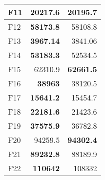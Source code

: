 \begin{table}[]
\begin{tabular}{l|r|r|}
\multicolumn{1}{|l|}{\cellcolor[HTML]{FCE6AB}F11}  & \cellcolor[HTML]{D3FFB6}\textbf{20217.6}                 & 20195.7                                                   \\ \hline
\multicolumn{1}{|l|}{\cellcolor[HTML]{FCE6AB}F12}  & \cellcolor[HTML]{D3FFB6}\textbf{58173.8}                 & 58108.8                                                   \\ \hline
\multicolumn{1}{|l|}{\cellcolor[HTML]{FCE6AB}F13}  & \cellcolor[HTML]{D3FFB6}\textbf{3967.14}                 & 3841.06                                                   \\ \hline
\multicolumn{1}{|l|}{\cellcolor[HTML]{FCE6AB}F14}  & \cellcolor[HTML]{D3FFB6}\textbf{53183.3}                 & 52534.5                                                   \\ \hline
\multicolumn{1}{|l|}{\cellcolor[HTML]{FCE6AB}F15}  & 62310.9                                                  & \cellcolor[HTML]{D3FFB6}\textbf{62661.5}                  \\ \hline
\multicolumn{1}{|l|}{\cellcolor[HTML]{FCE6AB}F16}  & \cellcolor[HTML]{D3FFB6}\textbf{38963}                   & 38120.5                                                   \\ \hline
\multicolumn{1}{|l|}{\cellcolor[HTML]{FCE6AB}F17}  & \cellcolor[HTML]{D3FFB6}\textbf{15641.2}                 & 15454.7                                                   \\ \hline
\multicolumn{1}{|l|}{\cellcolor[HTML]{FCE6AB}F18}  & \cellcolor[HTML]{D3FFB6}\textbf{22181.6}                 & 21423.6                                                   \\ \hline
\multicolumn{1}{|l|}{\cellcolor[HTML]{FCE6AB}F19}  & \cellcolor[HTML]{D3FFB6}\textbf{37575.9}                 & 36782.8                                                   \\ \hline
\multicolumn{1}{|l|}{\cellcolor[HTML]{FCE6AB}F20}  & 94259.5                                                  & \cellcolor[HTML]{D3FFB6}\textbf{94302.4}                  \\ \hline
\multicolumn{1}{|l|}{\cellcolor[HTML]{FCE6AB}F21}  & \cellcolor[HTML]{D3FFB6}\textbf{89232.8}                 & 88189.9                                                   \\ \hline
\multicolumn{1}{|l|}{\cellcolor[HTML]{FCE6AB}F22}  & \cellcolor[HTML]{D3FFB6}\textbf{110642}                  & 108332                                                    \\ \hline

\end{tabular}
\end{table}
